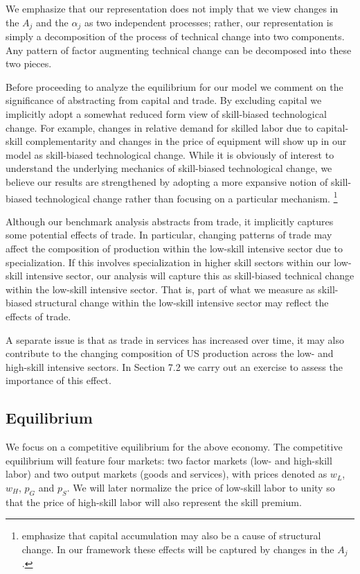 \documentclass[12pt,english]{article}
\begin{document}
We emphasize that our representation does not imply that we view changes in
the $A_{j}$ and the $\alpha _{j}$ as two independent processes; rather, our
representation is simply a decomposition of the process of technical change
into two components. Any pattern of factor augmenting technical change can
be decomposed into these two pieces.

Before proceeding to analyze the equilibrium for our model we comment on the
significance of abstracting from capital and trade. By excluding capital we
implicitly adopt a somewhat reduced form view of skill-biased technological
change. For example, changes in relative demand for skilled labor due to
capital-skill complementarity and changes in the price of equipment %
\citep[as in][]{KORV00} will show up in our model as skill-biased
technological change. While it is obviously of interest to understand the
underlying mechanics of skill-biased technological change, we believe our
results are strengthened by adopting a more expansive notion of skill-biased
technological change rather than focusing on a particular mechanism.%
\footnote{\citet{AceGue08} emphasize that capital accumulation may also be a
cause of structural change. In our framework these effects will be captured
by changes in the $A_{j}$.}

Although our benchmark analysis abstracts from trade, it implicitly captures
some potential effects of trade. In particular, changing patterns of trade
may affect the composition of production within the low-skill intensive
sector due to specialization. If this involves specialization in higher
skill sectors within our low-skill intensive sector, our analysis will
capture this as skill-biased technical change within the low-skill intensive
sector. That is, part of what we measure as skill-biased structural change
within the low-skill intensive sector may reflect the effects of trade.

A separate issue is that as trade in services has increased over time, it
may also contribute to the changing composition of US production across the
low- and high-skill intensive sectors. In Section 7.2 we carry out an
exercise to assess the importance of this effect.

\subsection{Equilibrium}

We focus on a competitive equilibrium for the above economy. The competitive
equilibrium will feature four markets: two factor markets (low- and
high-skill labor) and two output markets (goods and services), with prices
denoted as $w_{L}$, $w_{H}$, $p_{G}$ and $p_{S}$. We will later normalize
the price of low-skill labor to unity so that the price of high-skill labor
will also represent the skill premium.
\end{document}

